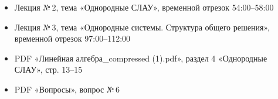 \begin{tcolorbox}[title=Источники, colback=gray!10]
\begin{itemize}
  \item Лекция №\,2, тема «Однородные СЛАУ», временной отрезок 54:00--58:00
  \item Лекция №\,3, тема «Однородные системы. Структура общего решения», временной отрезок 97:00--112:00
  \item PDF «Линейная алгебра\_compressed (1).pdf», раздел 4 «Однородные СЛАУ», стр. 13--15
  \item PDF «Вопросы», вопрос №\,6
\end{itemize}
\end{tcolorbox}
